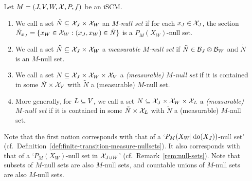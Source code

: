 \begin{Def}
  Let $M = \left ( J, V, W, \mathcal{X}, P, f \right )$ be an iSCM.
  \begin{enumerate}
    \item We call a set $\tilde{N} \subseteq \mathcal{X}_J \times \mathcal{X}_W$ an \emph{$M$-null set} if for each $x_J \in \mathcal{X}_J$, the section $\tilde{N}_{x_J} = \{x_W \in \mathcal{X}_W : (x_J,x_W) \in \tilde{N}\}$ is a $P_M(X_W)$-null set.
    \item We call a set $\tilde{N} \subseteq \mathcal{X}_J \times \mathcal{X}_W$ a \emph{measurable $M$-null set} if 
      $\tilde{N} \in \mathcal{B}_J \otimes \mathcal{B}_W$ and $\tilde{N}$ is an $M$-null set.
    \item We call a set $N \subseteq \mathcal{X}_J \times \mathcal{X}_W \times \mathcal{X}_V$ a \emph{(measurable) $M$-null set} if
      it is contained in some $\tilde{N} \times \mathcal{X}_V$ with $\tilde{N}$ a (measurable) $M$-null set.
    \item More generally, for $L \subseteq V$, we call a set $N \subseteq \mathcal{X}_J \times \mathcal{X}_W \times \mathcal{X}_L$ a \emph{(measurable) $M$-null set} if
      it is contained in some $\tilde{N} \times \mathcal{X}_L$ with $\tilde{N}$ a (measurable) $M$-null set.
  \end{enumerate}
\end{Def}  
Note that the first notion corresponds with that of a `$P_M(X_W | \operatorname{do}(X_J))$-null set' (cf.\ Definition~\ref{def:finite-transition-measure-nullsets}).
It also corresponds with that of a `$P_M(X_W)$-null set in $\mathcal{X}_{J \cup W}$' (cf.\ Remark~\ref{rem:null-sets}).
Note that subsets of $M$-null sets are also $M$-null sets, and countable unions of $M$-null sets are also $M$-null sets.

